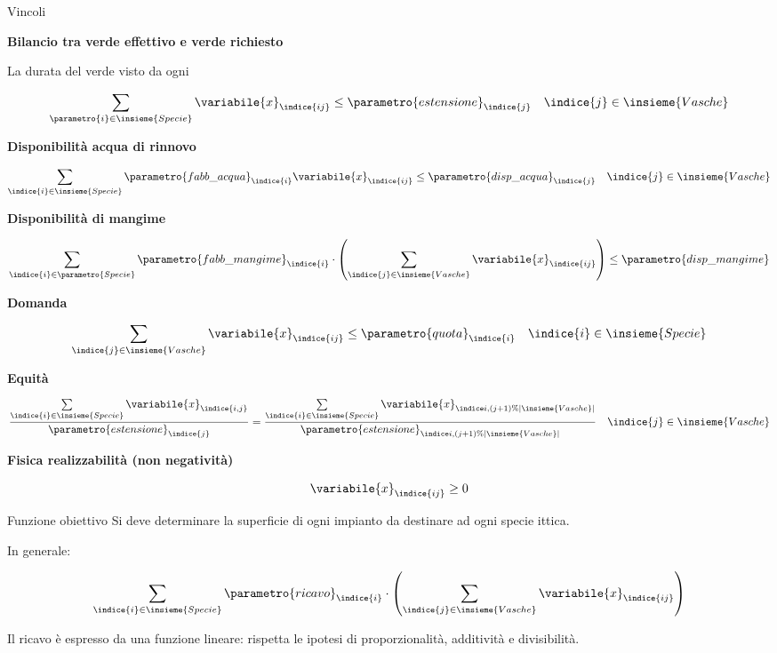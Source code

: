 \documentclass{beamer}
\begin{document}
\begin{frame}[allowframebreaks]{Vincoli}

\textbf{Bilancio tra verde effettivo e verde richiesto}

La durata del verde visto da ogni 

$$ \sum_{\parametro{i} \in \insieme{Specie}} \variabile{x}_{\indice{ij}} \leq \parametro{estensione}_{\indice{j}} \quad \indice{j} \in \insieme{Vasche}$$

\textbf{Disponibilit\`a acqua di rinnovo}

$$ \sum_{\indice{i} \in \insieme{Specie}} \parametro{fabb\_acqua}_{\indice{i}} \variabile{x}_{\indice{ij}} \leq \parametro{disp\_acqua}_{\indice{j}} \quad \indice{j} \in \insieme{Vasche}$$

\framebreak

\textbf{Disponibilit\`a di mangime}

$$ \sum_{\indice{i} \in \parametro{Specie}} \parametro{fabb\_mangime}_{\indice{i}} \cdot
      \left( \sum_{\indice{j} \in \insieme{Vasche}} \variabile{x}_{\indice{ij}} \right) \leq \parametro{disp\_mangime}$$

\textbf{Domanda}

$$ \sum_{\indice{j} \in \insieme{Vasche}} \variabile{x}_{\indice{ij}} \leq \parametro{quota}_{\indice{i}} \quad \indice{i} \in \insieme{Specie}$$

\textbf{Equit\`a}

$$ \frac{\sum\limits_{\indice{i} \in \insieme{Specie}} \variabile{x}_{\indice{i,j}}}{\parametro{estensione}_{\indice{j}}} =
   \frac{\sum\limits_{\indice{i} \in \insieme{Specie}} \variabile{x}_{\indice{i,(j+1)\%|\insieme{Vasche}|}}}{\parametro{estensione}_{\indice{i,(j+1)\%|\insieme{Vasche}|}}}
   \quad \indice{j} \in \insieme{Vasche}$$

\textbf{Fisica realizzabilit\`a (non negativit\`a)}

$$ \variabile{x}_{\indice{ij}} \geq 0 $$
\end{frame}

\begin{frame}{Funzione obiettivo}
Si deve determinare la superficie di ogni impianto da destinare ad ogni specie ittica.

In generale:

$$  \sum_{\indice{i} \in \insieme{Specie}} \parametro{ricavo}_{\indice{i}}\cdot
         \left(\sum_{\indice{j} \in \insieme{Vasche}} \variabile{x}_{\indice{ij}}\right)$$

Il ricavo \`e espresso da una funzione lineare: rispetta le ipotesi di proporzionalit\`a, additivit\`a e divisibilit\`a.
\end{frame}
\end{document}
